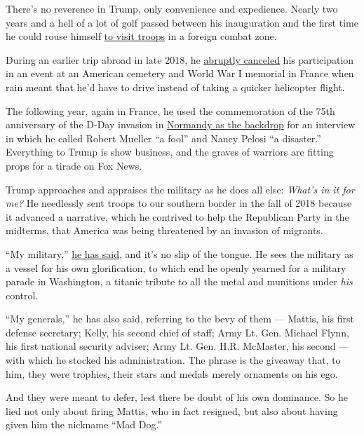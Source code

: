 There's no reverence in Trump, only convenience and expedience. Nearly
two years and a hell of a lot of golf passed between his inauguration
and the first time he could rouse himself
\href{https://www.nytimes3xbfgragh.onion/2018/12/26/us/politics/trump-iraq-troops-visit.html}{to
visit troops} in a foreign combat zone.

During an earlier trip abroad in late 2018, he
\href{https://www.politico.eu/article/donald-trump-rain-world-war-1-castigated-for-missing-event-paris-armistice/}{abruptly
canceled} his participation in an event at an American cemetery and
World War I memorial in France when rain meant that he'd have to drive
instead of taking a quicker helicopter flight.

The following year, again in France, he used the commemoration of the
75th anniversary of the D-Day invasion in
\href{https://www.nytimes3xbfgragh.onion/2019/06/06/world/europe/trump-france-dday.html}{Normandy
as the backdrop} for an interview in which he called Robert Mueller ``a
fool'' and Nancy Pelosi ``a disaster.'' Everything to Trump is show
business, and the graves of warriors are fitting props for a tirade on
Fox News.

Trump approaches and appraises the military as he does all else:
\emph{What's in it for me?} He needlessly sent troops to our southern
border in the fall of 2018 because it advanced a narrative, which he
contrived to help the Republican Party in the midterms, that America was
being threatened by an invasion of migrants.

``My military,''
\href{https://www.businessinsider.com/trump-my-generals-my-military-2017-10}{he
has said}, and it's no slip of the tongue. He sees the military as a
vessel for his own glorification, to which end he openly yearned for a
military parade in Washington, a titanic tribute to all the metal and
munitions under \emph{his} control.

``My generals,'' he has also said, referring to the bevy of them ---
Mattis, his first defense secretary; Kelly, his second chief of staff;
Army Lt. Gen. Michael Flynn, his first national security adviser; Army
Lt. Gen. H.R. McMaster, his second --- with which he stocked his
administration. The phrase is the giveaway that, to him, they were
trophies, their stars and medals merely ornaments on his ego.

And they were meant to defer, lest there be doubt of his own dominance.
So he lied not only about firing Mattis, who in fact resigned, but also
about having given him the nickname ``Mad Dog.''

